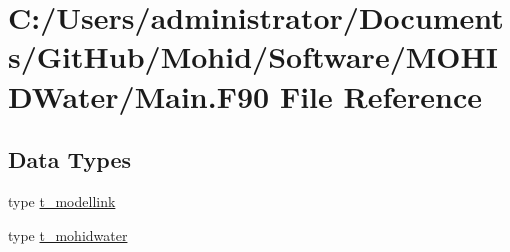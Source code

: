 \hypertarget{_main_8_f90}{}\section{C\+:/\+Users/administrator/\+Documents/\+Git\+Hub/\+Mohid/\+Software/\+M\+O\+H\+I\+D\+Water/\+Main.F90 File Reference}
\label{_main_8_f90}
\subsection*{Data Types}
\begin{DoxyCompactItemize}
\item 
type \mbox{\hyperlink{structt__modellink}{t\+\_\+modellink}}
\item 
type \mbox{\hyperlink{structt__mohidwater}{t\+\_\+mohidwater}}
\end{DoxyCompactItemize}
